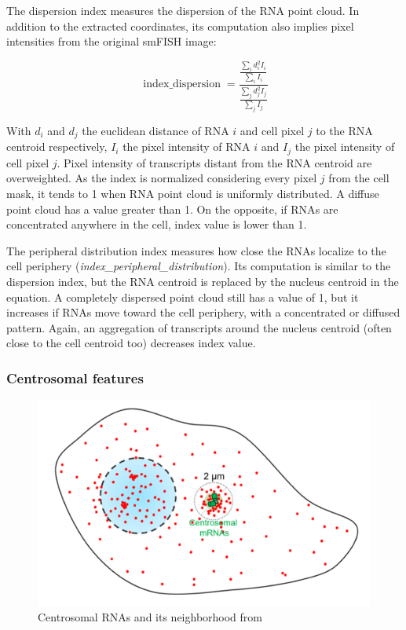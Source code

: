 The dispersion index measures the dispersion of the \ac{RNA} point cloud.
In addition to the extracted coordinates, its computation also implies pixel intensities from the original \ac{smFISH} image:

\begin{equation}
	{\displaystyle \operatorname{index\_dispersion} = \frac{\frac{\sum_{i} d_i^2 I_i}{\sum_{i} I_i}}{\frac{\sum_{j} d_j^2 I_j}{\sum_{j} I_j}}}
\end{equation}

\noindent
With $d_i$ and $d_j$ the euclidean distance of \ac{RNA} $i$ and cell pixel $j$ to the \ac{RNA} centroid respectively, $I_i$ the pixel intensity of \ac{RNA} $i$ and $I_j$ the pixel intensity of cell pixel $j$.
Pixel intensity of transcripts distant from the \ac{RNA} centroid are overweighted.
As the index is normalized considering every pixel $j$ from the cell mask, it tends to 1 when \ac{RNA} point cloud is uniformly distributed.
A diffuse point cloud has a value greater than 1.
On the opposite, if \ac{RNA}s are concentrated anywhere in the cell, index value is lower than 1.

The peripheral distribution index measures how close the \ac{RNA}s localize to the cell periphery (\emph{index\_peripheral\_distribution}).
Its computation is similar to the dispersion index, but the \ac{RNA} centroid is replaced by the nucleus centroid in the equation.
A completely dispersed point cloud still has a value of 1, but it increases if \ac{RNA}s move toward the cell periphery, with a concentrated or diffused pattern.
Again, an aggregation of transcripts around the nucleus centroid (often close to the cell centroid too) decreases index value.

\subsubsection{Centrosomal features}

\begin{figure}
	\begin{center}
	\includegraphics[width=\linewidth]{figures/chapter4/centrosomal_features}
	\caption[Centrosomal neighborhood]{Centrosomal RNAs and its neighborhood from~\cite{safieddine_choreography_2021}}
	\label{fig:centrosome_features}
	\end{center}
\end{figure}

